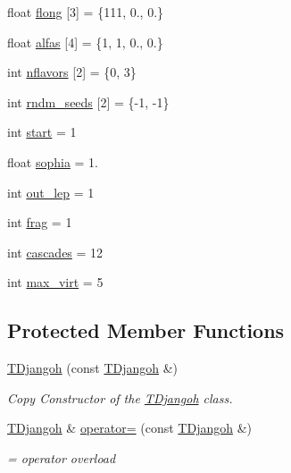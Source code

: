 \begin{DoxyCompactItemize}
\item 
float \hyperlink{class_t_djangoh_a9eb43fe747243662ae9da94fb769a80b}{flong} \mbox{[}3\mbox{]} = \{111, 0., 0.\}
\item 
float \hyperlink{class_t_djangoh_a74cbc9b27daed09c9b853b2f72669a71}{alfas} \mbox{[}4\mbox{]} = \{1, 1, 0., 0.\}
\item 
int \hyperlink{class_t_djangoh_af4b02bd635a9e893dc83224ce9997b26}{nflavors} \mbox{[}2\mbox{]} = \{0, 3\}
\item 
int \hyperlink{class_t_djangoh_aa3e99a785adc52679432d6446dfdc850}{rndm\+\_\+seeds} \mbox{[}2\mbox{]} = \{-\/1, -\/1\}
\item 
int \hyperlink{class_t_djangoh_a8e88fc34f9f5e6e0b62af4054bbe9ce3}{start} = 1
\item 
float \hyperlink{class_t_djangoh_a1ecc5438155094281e9867acb6b4432f}{sophia} = 1.
\item 
int \hyperlink{class_t_djangoh_a4b87824fa6a4af88c4c9bb69fdd87f31}{out\+\_\+lep} = 1
\item 
int \hyperlink{class_t_djangoh_ab7d3ea58eb6f4c59f68703e0b80614f9}{frag} = 1
\item 
int \hyperlink{class_t_djangoh_a804083301c1acef844fa78a2c36fdf32}{cascades} = 12
\item 
int \hyperlink{class_t_djangoh_aaf2a9c700d5ec37607f7241d2b13bd17}{max\+\_\+virt} = 5
\end{DoxyCompactItemize}
\subsection*{Protected Member Functions}
\begin{DoxyCompactItemize}
\item 
\hyperlink{class_t_djangoh_a7b47ea508e2047b99b6f3efd6ba37278}{T\+Djangoh} (const \hyperlink{class_t_djangoh}{T\+Djangoh} \&)
\begin{DoxyCompactList}\small\item\em Copy Constructor of the \hyperlink{class_t_djangoh}{T\+Djangoh} class. \end{DoxyCompactList}\item 
\hyperlink{class_t_djangoh}{T\+Djangoh} \& \hyperlink{class_t_djangoh_a987204dc283979db28c83e5a35177b7c}{operator=} (const \hyperlink{class_t_djangoh}{T\+Djangoh} \&)
\begin{DoxyCompactList}\small\item\em = operator overload \end{DoxyCompactList}\end{DoxyCompactItemize}
